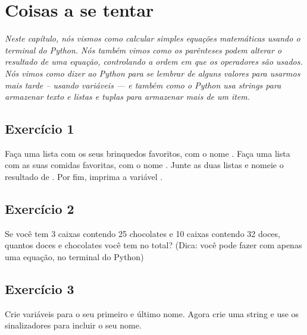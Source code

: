 \section{Coisas a se tentar}

\emph{Neste capítulo, nós vismos como calcular simples equações matemáticas usando o terminal do Python. Nós também vimos como os parênteses podem alterar o resultado de uma equação, controlando a ordem em que os operadores são usados. Nós vimos como dizer ao Python para se lembrar de alguns valores para usarmos mais tarde -- usando variáveis --- e também como o Python usa strings para armazenar texto e listas e tuplas para armazenar mais de um item.}
\par

\subsection*{Exercício 1}
Faça uma lista com os seus brinquedos favoritos, com o nome . Faça uma lista com as suas comidas favoritas, com o nome . Junte as duas listas e nomeie o resultado de . Por fim, imprima a variável .

\subsection*{Exercício 2}
Se você tem 3 caixas contendo 25 chocolates e 10 caixas contendo 32 doces, quantos doces e chocolates você tem no total? (Dica: você pode fazer com apenas uma equação, no terminal do Python)

\subsection*{Exercício 3}
Crie variáveis para o seu primeiro e último nome. Agora crie uma string e use os sinalizadores para incluir o seu nome.


\newpage
